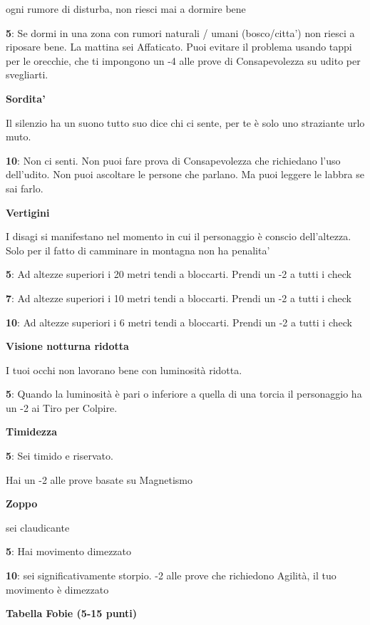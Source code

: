 \documentclass[a4paper,11pt,twoside,openany]{book}
\begin{document}
ogni rumore di disturba, non riesci mai a dormire bene

\textbf{5}: Se dormi in una zona con rumori naturali / umani (bosco/citta') non riesci a riposare bene. La mattina sei Affaticato. Puoi evitare il problema usando tappi per le orecchie, che ti impongono un -4 alle prove di Consapevolezza su udito per svegliarti.

\textbf{Sordita'}

Il silenzio ha un suono tutto suo dice chi ci sente, per te è solo uno straziante urlo muto.

\textbf{10}: Non ci senti. Non puoi fare prova di Consapevolezza che richiedano l'uso dell'udito. Non puoi ascoltare le persone che parlano. Ma puoi leggere le labbra se sai farlo.

\textbf{Vertigini}

I disagi si manifestano nel momento in cui il personaggio è conscio dell'altezza. Solo per il fatto di camminare in montagna non ha penalita'

\textbf{5}: Ad altezze superiori i 20 metri tendi a bloccarti. Prendi un -2 a tutti i check

\textbf{7}: Ad altezze superiori i 10 metri tendi a bloccarti. Prendi un -2 a tutti i check

\textbf{10}: Ad altezze superiori i 6 metri tendi a bloccarti. Prendi un -2 a tutti i check

\textbf{Visione notturna ridotta}

I tuoi occhi non lavorano bene con luminosità ridotta.

\textbf{5}: Quando la luminosità è pari o inferiore a quella di una torcia il personaggio ha un -2 ai Tiro per Colpire.

\textbf{Timidezza}

\textbf{5}: Sei timido e riservato.

Hai un -2 alle prove basate su Magnetismo

\textbf{Zoppo}

sei claudicante

\textbf{5}: Hai movimento dimezzato

\textbf{10}: sei significativamente storpio. -2 alle prove che richiedono Agilità, il tuo movimento è dimezzato

\bigskip

\textbf{Tabella Fobie (5-15 punti)}
\end{document}
